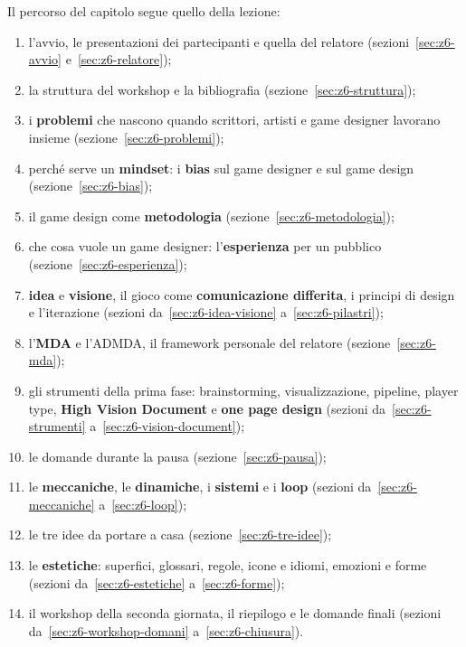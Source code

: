 Il percorso del capitolo segue quello della lezione:
\begin{enumerate}
  \item l'avvio, le presentazioni dei partecipanti e quella del relatore
        (sezioni~\ref{sec:z6-avvio} e~\ref{sec:z6-relatore});
  \item la struttura del workshop e la bibliografia
        (sezione~\ref{sec:z6-struttura});
  \item i \textbf{problemi} che nascono quando scrittori, artisti e game
        designer lavorano insieme (sezione~\ref{sec:z6-problemi});
  \item perché serve un \textbf{mindset}: i \textbf{bias} sul game designer e
        sul game design (sezione~\ref{sec:z6-bias});
  \item il game design come \textbf{metodologia} (sezione~\ref{sec:z6-metodologia});
  \item che cosa vuole un game designer: l'\textbf{esperienza} per un pubblico
        (sezione~\ref{sec:z6-esperienza});
  \item \textbf{idea} e \textbf{visione}, il gioco come \textbf{comunicazione
        differita}, i principi di design e l'iterazione (sezioni
        da~\ref{sec:z6-idea-visione} a~\ref{sec:z6-pilastri});
  \item l'\textbf{MDA} e l'ADMDA, il framework personale del relatore
        (sezione~\ref{sec:z6-mda});
  \item gli strumenti della prima fase: brainstorming, visualizzazione,
        pipeline, player type, \textbf{High Vision Document} e \textbf{one page
        design} (sezioni da~\ref{sec:z6-strumenti} a~\ref{sec:z6-vision-document});
  \item le domande durante la pausa (sezione~\ref{sec:z6-pausa});
  \item le \textbf{meccaniche}, le \textbf{dinamiche}, i \textbf{sistemi} e i
        \textbf{loop} (sezioni da~\ref{sec:z6-meccaniche} a~\ref{sec:z6-loop});
  \item le tre idee da portare a casa (sezione~\ref{sec:z6-tre-idee});
  \item le \textbf{estetiche}: superfici, glossari, regole, icone e idiomi,
        emozioni e forme (sezioni da~\ref{sec:z6-estetiche}
        a~\ref{sec:z6-forme});
  \item il workshop della seconda giornata, il riepilogo e le domande finali
        (sezioni da~\ref{sec:z6-workshop-domani} a~\ref{sec:z6-chiusura}).
\end{enumerate}


